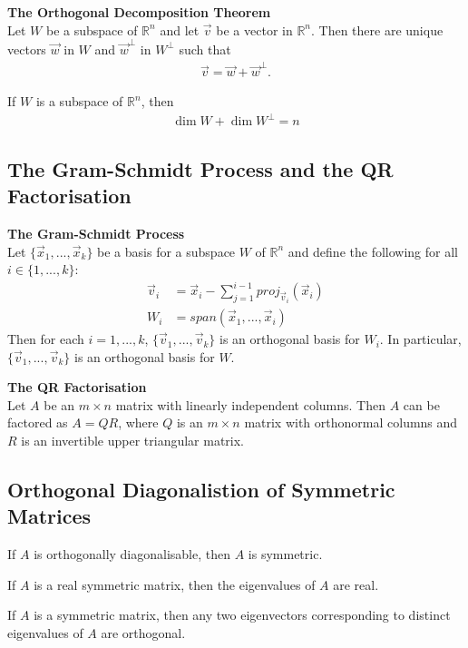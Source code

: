 \documentclass{article}
\begin{document}
\begin{theorem}
	\textbf{The Orthogonal Decomposition Theorem}\\
	Let $W$ be a subspace of $\mathbb{R}^n$ and let $\vec v$ be a vector in $\mathbb{R}^n$.
	Then there are unique vectors $\vec w$ in $W$ and $\vec w^{\perp}$ in $W^{\perp}$ such that
	\begin{align*}
		\vec v = \vec w + \vec w^{\perp}.
	\end{align*}
\end{theorem}
\setcounter{theorem}{12}
\begin{theorem}
	If $W$ is a subspace of $\mathbb{R}^n$, then
	\begin{align*}
		\dim W + \dim W^{\perp} = n
	\end{align*}
\end{theorem}
\setcounter{theorem}{14}
\subsection{The Gram-Schmidt Process and the QR Factorisation}
\begin{theorem}
	\textbf{The Gram-Schmidt Process}\\
	Let $\{\vec x_1, ..., \vec x_k\}$ be a basis for a subspace $W$ of $\mathbb{R}^n$ and define the following for all $i\in\{1,...,k\}$:
	\begin{align*}
		\vec v_i & = \vec x_i - \sum^{i-1}_{j=1} proj_{\vec v_i}(\vec x_i) \\
		W_i      & = span(\vec x_1, ..., \vec x_i)
	\end{align*}
	Then for each $i=1, ..., k$, $\{\vec v_1, ..., \vec v_k\}$ is an orthogonal basis for $W_i$. In particular, $\{\vec v_1, ..., \vec v_k\}$ is an orthogonal basis for $W$.
\end{theorem}
\begin{theorem}
	\textbf{The QR Factorisation}\\
	Let $A$ be an $m\times n$ matrix with linearly independent columns. Then $A$ can be factored as $A=QR$, where $Q$ is an $m\times n$ matrix with orthonormal columns and $R$ is an invertible upper triangular matrix.
\end{theorem}
\subsection{Orthogonal Diagonalistion of Symmetric Matrices}
\begin{theorem}
	If $A$ is orthogonally diagonalisable, then $A$ is symmetric.
\end{theorem}
\begin{theorem}
	If $A$ is a real symmetric matrix, then the eigenvalues of $A$ are real.
\end{theorem}
\begin{theorem}
	If $A$ is a symmetric matrix, then any two eigenvectors corresponding to distinct eigenvalues of $A$ are orthogonal.
\end{theorem}
\end{document}
